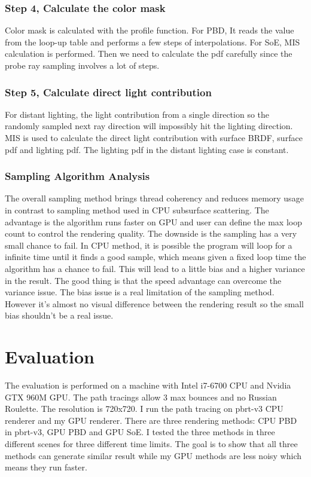 \documentclass[letterpaper,12pt]{article}
\begin{document}
\subsubsection{Step 4, Calculate the color mask}

Color mask is calculated with the profile function. For PBD, It reads the value from the loop-up table and performs a few steps of interpolations. For SoE, MIS calculation is performed. Then we need to calculate the pdf carefully since the probe ray sampling involves a lot of steps.

\subsubsection{Step 5, Calculate direct light contribution}

For distant lighting, the light contribution from a single direction so the randomly sampled next ray direction will impossibly hit the lighting direction. MIS is used to calculate the direct light contribution with surface BRDF, surface pdf and lighting pdf. The lighting pdf in the distant lighting case is constant.

\subsubsection{Sampling Algorithm Analysis}

The overall sampling method brings thread coherency and reduces memory usage in contrast to sampling method used in CPU subsurface scattering. The advantage is the algorithm runs faster on GPU and user can define the max loop count to control the rendering quality. The downside is the sampling has a very small chance to fail. In CPU method, it is possible the program will loop for a infinite time until it finds a good sample, which means given a fixed loop time the algorithm has a chance to fail. This will lead to a little bias and a higher variance in the result. The good thing is that the speed advantage can overcome the variance issue. The bias issue is a real limitation of the sampling method. However it's almost no visual difference between the rendering result so the small bias shouldn't be a real issue.

\section{Evaluation}

The evaluation is performed on a machine with Intel i7-6700 CPU and Nvidia GTX 960M GPU. The path tracings allow 3 max bounces and no Russian Roulette. The resolution is 720x720. I run the path tracing on pbrt-v3 CPU renderer and my GPU renderer. There are three rendering methods: CPU PBD in pbrt-v3, GPU PBD and GPU SoE. I tested the three methods in three different scenes for three different time limits. The goal is to show that all three methods can generate similar result while my GPU methods are less noisy which means they run faster.
\end{document}

